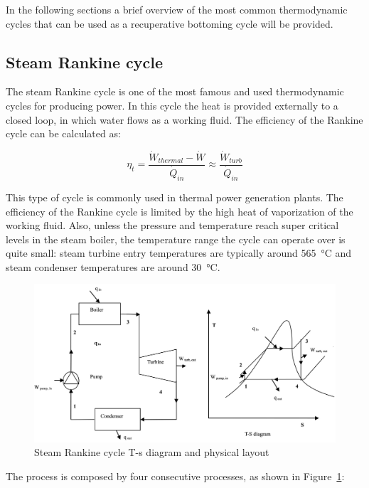 In the following sections a brief overview of the most common thermodynamic cycles that can be used as a recuperative bottoming cycle will be provided.

\subsection{Steam Rankine cycle}

The steam Rankine cycle is one of the most famous and used thermodynamic cycles for producing power. In this cycle the heat is provided externally to a closed loop, in which water flows as a working fluid. The efficiency of the Rankine cycle can be calculated as:

\begin{equation} \label{eq:eta_rankine}
  \eta_t = \frac{\dot{W}_{thermal}-\dot{W}}{\dot{Q}_{in}} \approx \frac{\dot{W}_{turb}}{\dot{Q}_{in}}
\end{equation}

This type of cycle is commonly used in thermal power generation plants. The efficiency of the Rankine cycle is limited by the high heat of vaporization of the working fluid. Also, unless the pressure and temperature reach super critical levels in the steam boiler, the temperature range the cycle can operate over is quite small: steam turbine entry temperatures are typically around \SI{565}{\celsius} and steam condenser temperatures are around \SI{30}{\celsius}.

\begin{figure}[ht]
  \centering
  \includegraphics[width=\textwidth]{figures/review/rankine_steam.jpg}
  \caption{Steam Rankine cycle T-s diagram and physical layout\label{fig:rankine_steam} }
\end{figure}

The process is composed by four consecutive processes, as shown in Figure~\ref{fig:rankine_steam}:

